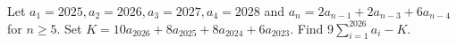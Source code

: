 Let $a_1=2025,a_2=2026,a_3=2027,a_4=2028$ and $a_n=2a_{n-1}+2a_{n-3}+6a_{n-4}$ for $n\ge5$. Set $K=10a_{2026}+8a_{2025}+8a_{2024}+6a_{2023}$. Find $9\sum_{i=1}^{2026}a_i-K$.
